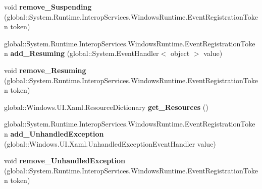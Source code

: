 \begin{DoxyCompactItemize}
\item 
\mbox{\label{interface_windows_1_1_u_i_1_1_xaml_1_1_i_application_a2d065fda78dfbe6343b98c8c19648fcf}} 
void {\bfseries remove\+\_\+\+Suspending} (global\+::\+System.\+Runtime.\+Interop\+Services.\+Windows\+Runtime.\+Event\+Registration\+Token token)
\item 
\mbox{\label{interface_windows_1_1_u_i_1_1_xaml_1_1_i_application_adad8e0f1037225acc55bfcc1272edcd4}} 
global\+::\+System.\+Runtime.\+Interop\+Services.\+Windows\+Runtime.\+Event\+Registration\+Token {\bfseries add\+\_\+\+Resuming} (global\+::\+System.\+Event\+Handler$<$ object $>$ value)
\item 
\mbox{\label{interface_windows_1_1_u_i_1_1_xaml_1_1_i_application_a3388b85af6dfd9f47abf5dbfe7274acb}} 
void {\bfseries remove\+\_\+\+Resuming} (global\+::\+System.\+Runtime.\+Interop\+Services.\+Windows\+Runtime.\+Event\+Registration\+Token token)
\item 
\mbox{\label{interface_windows_1_1_u_i_1_1_xaml_1_1_i_application_af85326d17430aa8cf53216ec4beb0251}} 
global\+::\+Windows.\+U\+I.\+Xaml.\+Resource\+Dictionary {\bfseries get\+\_\+\+Resources} ()
\item 
\mbox{\label{interface_windows_1_1_u_i_1_1_xaml_1_1_i_application_ae4f5867a120030fd6bfe6cf03786a52d}} 
global\+::\+System.\+Runtime.\+Interop\+Services.\+Windows\+Runtime.\+Event\+Registration\+Token {\bfseries add\+\_\+\+Unhandled\+Exception} (global\+::\+Windows.\+U\+I.\+Xaml.\+Unhandled\+Exception\+Event\+Handler value)
\item 
\mbox{\label{interface_windows_1_1_u_i_1_1_xaml_1_1_i_application_ab5826c25b60c9dc3ea4c0dff5937ea55}} 
void {\bfseries remove\+\_\+\+Unhandled\+Exception} (global\+::\+System.\+Runtime.\+Interop\+Services.\+Windows\+Runtime.\+Event\+Registration\+Token token)
\item 
\mbox{\label{interface_windows_1_1_u_i_1_1_xaml_1_1_i_application_ac0c225619b2deaf238efa786fac50afb}} 

\end{DoxyCompactItemize}
